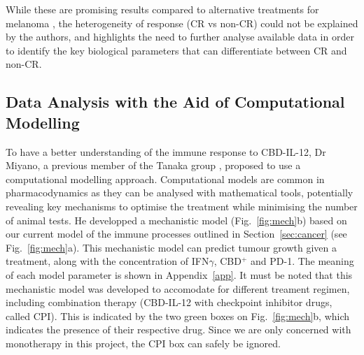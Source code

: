 \documentclass[11pt]{article}
\begin{document}
While these are promising results compared to alternative treatments for melanoma \cite{reviewImmunoMelanoma}, the heterogeneity of response (CR vs non-CR) could not be explained by the authors, and highlights the need to further analyse available data in order to identify the key biological parameters that can differentiate between CR and non-CR.

\subsection{Data Analysis with the Aid of Computational Modelling}\label{ssec:prevWork}

To have a better understanding of the immune response to CBD-IL-12, Dr Miyano, a previous member of the Tanaka group \cite{takuya}, proposed to use a computational modelling approach. Computational models are common in pharmacodynamics as they can be analysed with mathematical tools, potentially revealing key mechanisms to optimise the treatment while minimising the number of animal tests. He developped a mechanistic model (Fig.~\ref{fig:mech}b) based on our current model of the immune processes outlined in Section~\ref{sec:cancer} (see Fig.~\ref{fig:mech}a). This mechanistic model can predict tumour growth given a treatment, along with the concentration of IFN$\gamma$, CBD$^+$ and PD-1. The meaning of each model parameter is shown in Appendix~\ref{app}. It must be noted that this mechanistic model was developed to accomodate for different treament regimen, including combination therapy (CBD-IL-12 with checkpoint inhibitor drugs, called CPI). This is indicated by the two green boxes on Fig.~\ref{fig:mech}b, which indicates the presence of their respective drug. Since we are only concerned with monotherapy in this project, the CPI box can safely be ignored.
\end{document}
